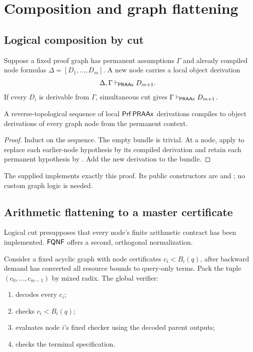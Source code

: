\section{Composition and graph flattening}

\subsection{Logical composition by cut}

Suppose a fixed proof graph has permanent assumptions \(\Gamma\) and already
compiled node formulas \(\Delta=[D_1,\ldots,D_m]\).  A new node carries a local
object derivation
\[
  \Delta,\Gamma\mathrel{\vdash_{\!\mathsf{PRAAx}}} D_{m+1}.
\]
If every \(D_i\) is derivable from \(\Gamma\), simultaneous cut gives
\(\Gamma\mathrel{\vdash_{\!\mathsf{PRAAx}}} D_{m+1}\).

\begin{proposition}\label{prop:node-cut}
A reverse-topological sequence of local \(\mathsf{Prf}\,\mathsf{PRAAx}\) derivations compiles
to object derivations of every graph node from the permanent context.
\end{proposition}

\begin{proof}
Induct on the sequence.  The empty bundle is trivial.  At a node, apply
 to replace each earlier-node hypothesis by its compiled
derivation and retain each permanent hypothesis by .  Add the
new derivation to the bundle.
\end{proof}

The supplied  implements exactly this proof.  Its
public constructors are  and
; no custom graph logic is needed.

\subsection{Arithmetic flattening to a master certificate}

Logical cut presupposes that every node's finite arithmetic contract has been
implemented.  \(\mathsf{FQNF}\) offers a second, orthogonal normalization.

Consider a fixed acyclic graph with node certificates
\(c_i<B_i(q)\), after backward demand has converted all resource bounds to
query-only terms.  Pack the tuple \((c_0,\ldots,c_{m-1})\) by mixed radix.  The
global verifier:

\begin{enumerate}
\item decodes every \(c_i\);
\item checks \(c_i<B_i(q)\);
\item evaluates node \(i\)'s fixed checker using the decoded parent outputs;
\item checks the terminal specification.
\end{enumerate}

